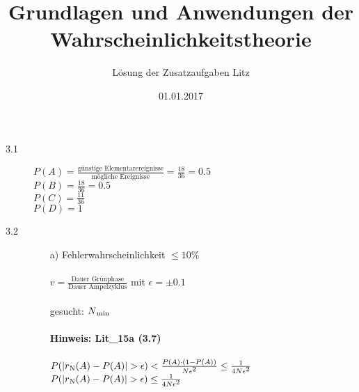 \documentclass[a4paper]{article}
\begin{document}


\title{\LARGE Grundlagen und Anwendungen der Wahrscheinlichkeitstheorie} 
\author{\Large Lösung der Zusatzaufgaben Litz}
\date{01.01.2017}
\maketitle


\begin{description}

\item[3.1]
				
         $P(A)= \frac{\text{günstige Elementarereignisse}}{\text{mögliche Ereignisse}}= \frac{18}{36				}= 0.5$\\
         $P(B)= \frac{18}{36}= 0.5$\\
         $P(C)= \frac{11}{36}$\\
         $P(D)= 1$\\

\item[3.2] 

         \begin{itemize}
            \item[a)] Fehlerwahrscheinlichkeit $\leq 10\%$\\
											\\
											$v=\frac{\text{Dauer Grünphase}}{\text{Dauer Ampelzyklus}}$ mit $\epsilon= \pm 0.1$\\
											\\
											gesucht: $N\textsubscript{min}$\\
											\\
											\textbf{Hinweis: Lit\_15a (3.7)}\\
											\\
											$P(\left|r\textsubscript{N}(A)-P(A)\right|>\epsilon) < \frac{P(A)\cdot(1-P(A))}{N\epsilon\textsuperscript{2}} \leq \frac{1}{4N\epsilon\textsuperscript{2}}$\\
											
											$P(\left|r\textsubscript{N}(A)-P(A)\right|>\epsilon) \leq \frac{1}{4N\epsilon\textsuperscript{2}}$\\
											

\end{itemize}
\end{description}
\end{document}
